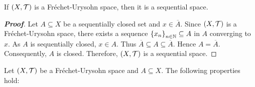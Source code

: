 \begin{proposition}
  \rm If $\left(X,\mathcal{T}\right)$ is a Fréchet-Urysohn space, then it is a sequential space.
  \begin{proof}[\rm\textbf{Proof}]
    Let $A\subseteq X$ be a sequentially closed set and $x\in\overline{A}$. Since $\left(X,\mathcal{T}\right)$ is a Fréchet-Urysohn space, there exists a sequence $\left\{x_n\right\}_{n\in\mathbb{N}}\subseteq A$ in $A$ converging to $x$. As $A$ is sequentially closed, $x\in A$. Thus $\overline{A}\subseteq A\subseteq\overline{A}$. Hence $A=\overline{A}$. Consequently, $A$ is closed. Therefore, $\left(X,\mathcal{T}\right)$ is a sequential space.
  \end{proof}
\end{proposition}

\begin{proposition}
  Let $\left(X,\mathcal{T}\right)$ be a Fréchet-Urysohn space and $A\subseteq X$. The following properties hold:


\end{proposition}
